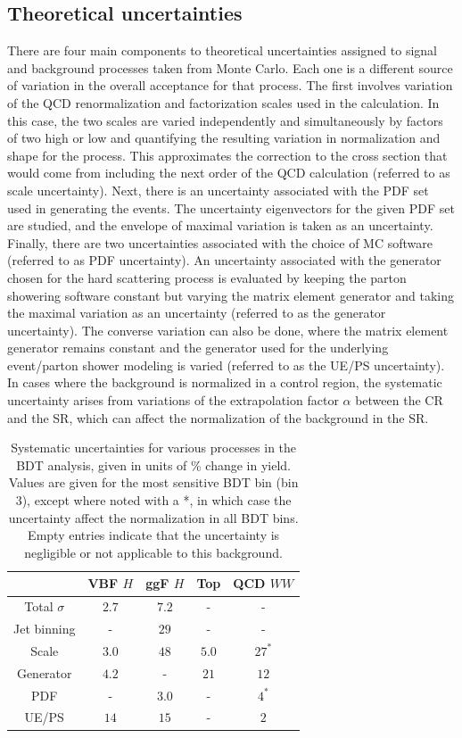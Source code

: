 \subsection{Theoretical uncertainties}

There are four main components to theoretical uncertainties assigned to signal and background processes taken from Monte Carlo. Each one is a different source of variation in the overall acceptance for that process. The first involves variation of the QCD renormalization and factorization scales used in the calculation. In this case, the two scales are varied independently and simultaneously by factors of two high or low and quantifying the resulting variation in normalization and shape for the process.  This approximates the correction to the cross section that would come from including the next order of the QCD calculation (referred to as scale uncertainty). Next, there is an uncertainty associated with the PDF set used in generating the events. The uncertainty eigenvectors for the given PDF set are studied, and the envelope of maximal variation is taken as an uncertainty. Finally, there are two uncertainties associated with the choice of MC software (referred to as PDF uncertainty). An uncertainty associated with the generator chosen for the hard scattering process is evaluated by keeping the parton showering software constant but varying the matrix element generator and taking the maximal variation as an uncertainty (referred to as the generator uncertainty). The converse variation can also be done, where the matrix element generator remains constant and the generator used for the underlying event/parton shower modeling is varied (referred to as the UE/PS uncertainty). In cases where the background is normalized in a control region, the systematic uncertainty arises from variations of the extrapolation factor $\alpha$ between the CR and the SR, which can affect the normalization of the background in the SR. 

\begin{table}[h!]
\centering
\captionsetup{justification=centering}
\begin{tabular}{|c|c|c|c|c|}
\hline
& VBF $H$ & ggF $H$ & Top & QCD $WW$  \\ \hline

Total $\sigma$ & $2.7$ & $7.2$ & - & - \\ \hline
Jet binning & - & $29$ & - & - \\ \hline
Scale & $3.0$ & $48$ & $5.0$ & $27^*$ \\ \hline
Generator & $4.2$ & - & $21$ & $12$ \\ \hline
PDF & - & $3.0$ & - & $4^*$ \\ \hline
UE/PS & $14$ & $15$ & - & $2$ \\ \hline
\end{tabular}
\caption{Systematic uncertainties for various processes in the BDT analysis, given in units of \% change in yield. Values are given for the most sensitive BDT bin (bin 3), except where noted with a *, in which case the uncertainty affect the normalization in all BDT bins. Empty entries indicate that the uncertainty is negligible or not applicable to this background.}
\label{tab:vbf_bdt_theosys}
\end{table}

